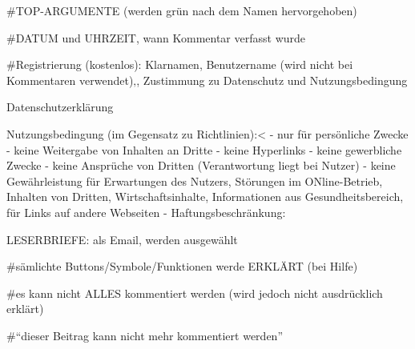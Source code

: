 #TOP-ARGUMENTE (werden grün nach dem Namen hervorgehoben)

#DATUM und UHRZEIT, wann Kommentar verfasst wurde

#Registrierung (kostenlos): Klarnamen, Benutzername (wird nicht bei Kommentaren verwendet)‚, Zustimmung zu Datenschutz und Nutzungsbedingung

Datenschutzerklärung

Nutzungsbedingung (im Gegensatz zu Richtlinien):<
- nur für persönliche Zwecke
- keine Weitergabe von Inhalten an Dritte
- keine Hyperlinks
- keine gewerbliche Zwecke
- keine Ansprüche von Dritten (Verantwortung liegt bei Nutzer)
- keine Gewährleistung für Erwartungen des Nutzers, Störungen im ONline-Betrieb, Inhalten von Dritten, Wirtschaftsinhalte, Informationen aus Gesundheitsbereich, für Links auf andere Webseiten
- Haftungsbeschränkung: 


LESERBRIEFE: als Email, werden ausgewählt

#sämlichte Buttons/Symbole/Funktionen werde ERKLÄRT (bei Hilfe)

#es kann nicht ALLES kommentiert werden (wird jedoch nicht ausdrücklich erklärt)

#``dieser Beitrag kann nicht mehr kommentiert werden''






